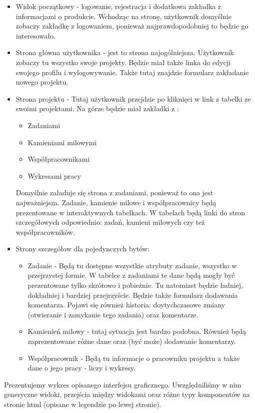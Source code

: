 \documentclass[a4paper,12pt,notitlepage]{mwrep}
\begin{document}
\begin{itemize}
	\item	Widok początkowy - logowanie, rejestracja i dodatkowa zakładka z informacjami o produkcie. Wchodząc na stronę, 
		użytkownik domyślnie zobaczy zakładkę z logowaniem, ponieważ najprawdopodobniej to będzie go interesowało.
	\item	Strona główna użytkownika - jest to strona najogólniejsza. Użytkownik zobaczy tu wszystko swoje projekty. Będzie miał 
		także linka do edycji swojego profilu i wylogowywanie. Także tutaj znajdzie formularz zakładanie nowego projektu.
	\item	Strona projektu - Tutaj użytkownik przejdzie po kliknięci w link z tabelki ze swoimi projektami. Na górze będzie miał 
		zakładki z :
	\begin{itemize}
		\item	Zadaniami
		\item	Kamieniami milowymi
		\item	Współpracownikami
		\item	Wykresami pracy
	\end{itemize}
		Domyślnie załaduje się strona z zadaniami, ponieważ to ona jest najważniejsza. Zadanie, kamienie milowe i współpracownicy 
		będą prezentowane w interaktywnych tabelkach. W tabelach będą linki do stron szczegółowych odpowiednio: zadań, 
		kamieni milowych czy też współpracowników.
	\item	Strony szczegółow dla pojedynczych bytów:
	\begin{itemize}
		\item	Zadanie - Będą tu dostępne wszystkie atrybuty zadanie, wszystko w przejrzystej formie. W tabelce z zadaniami te
			dane będą mogły być prezentowane tylko skrótowo i pobieżnie. Tu natomiast będzie ładniej, dokładniej i bardziej 
			przejrzyście. Będzie także formularz dodawania komentarza. Pojawi się również historia: doytychczasowe zmiany 
			(otwieranie i zamykanie tego zadania) oraz komentarze.
		\item	Kamienień milowy - tutaj sytuacja jest bardzo podobna. Również będą zaprezentowane różne dane oraz (być może) 
			dodawanie komentarzy.
		\item	Współpracownik - Będą tu informacje o pracowniku projektu a także dane o jego pracy - liczy i wykresy.
	\end{itemize}
\end{itemize}

Prezentujemy wykres opisanego interfejsu graficznego. Uwzględniliśmy w nim generyczne widoki, przejścia między widokami oraz różne typy 
komponentów na stronie html (opisane w legendzie po lewej stronie). \\
\end{document}
